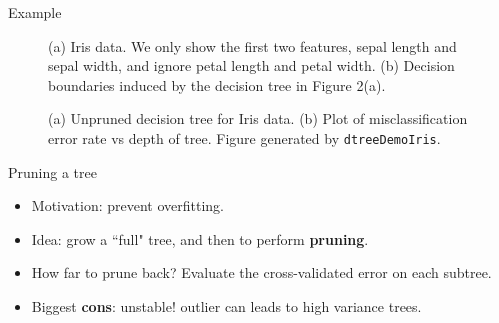 \documentclass[10pt,mathserif]{beamer}
\begin{document}
\begin{frame}{Example}
\begin{figure}[h]
\centering
{}
\caption{(a) Iris data. We only show the first two features, sepal length and sepal width, and ignore petal length and petal width. (b) Decision boundaries induced by the decision tree in Figure 2(a).}
\end{figure}

\begin{figure}[h]
\centering
{}
\caption{(a) Unpruned decision tree for Iris data. (b) Plot of misclassification error rate vs depth of tree. Figure generated by \texttt{dtreeDemoIris}.}
\end{figure}
\end{frame}

\begin{frame}{Pruning a tree}
\begin{itemize}
    \item Motivation: prevent overfitting. 
    \item Idea: grow a ``full" tree, and then to perform \textbf{pruning}.
    \item How far to prune back? Evaluate the cross-validated error on each subtree.
    \item Biggest \textbf{cons}: unstable! outlier can leads to high variance trees.
\end{itemize}
\end{frame}
\end{document}
